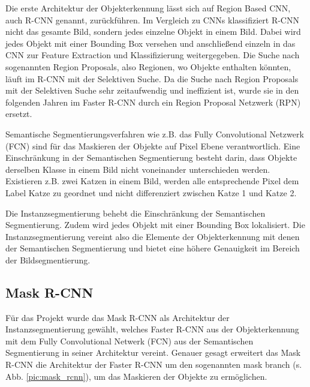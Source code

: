 Die erste Architektur der Objekterkennung lässt sich auf Region Based CNN, auch R-CNN genannt, zurückführen. Im Vergleich zu CNNs klassifiziert R-CNN nicht das gesamte Bild, sondern jedes einzelne Objekt in einem Bild. Dabei wird jedes Objekt mit einer Bounding Box versehen und anschließend einzeln in das CNN zur Feature Extraction und Klassifizierung weitergegeben. Die Suche nach sogenannten Region Proposals, also Regionen, wo Objekte enthalten könnten, läuft im R-CNN mit der Selektiven Suche. Da die Suche nach Region Proposals mit der Selektiven Suche sehr zeitaufwendig und ineffizient ist, wurde sie in den folgenden Jahren im Faster R-CNN durch ein Region Proposal Netzwerk (RPN) ersetzt. 

Semantische Segmentierungsverfahren wie z.B. das Fully Convolutional Netzwerk (FCN) sind für das Maskieren der Objekte auf Pixel Ebene verantwortlich. Eine Einschränkung in der Semantischen Segmentierung besteht darin, dass Objekte derselben Klasse in einem Bild nicht voneinander unterschieden werden. Existieren z.B. zwei Katzen in einem Bild, werden alle entsprechende Pixel dem Label Katze zu geordnet und nicht differenziert zwischen Katze 1 und Katze 2.

Die Instanzsegmentierung behebt die Einschränkung der Semantischen Segmentierung. Zudem wird jedes Objekt mit einer Bounding Box lokalisiert. Die Instanzsegmentierung vereint also die Elemente der Objekterkennung mit denen der Semantischen Segmentierung und bietet eine höhere Genauigkeit im Bereich der Bildsegmentierung. 

\subsection{Mask R-CNN}

Für das Projekt wurde das Mask R-CNN als Architektur der Instanzsegmentierung gewählt, welches Faster R-CNN aus der Objekterkennung mit dem Fully Convolutional Netwerk (FCN) aus der Semantischen Segmentierung in seiner Architektur vereint. Genauer gesagt erweitert das Mask R-CNN die Architektur der Faster R-CNN um den sogenannten mask branch (s. Abb. \ref{pic:mask_rcnn}), um das Maskieren der Objekte zu ermöglichen. 

